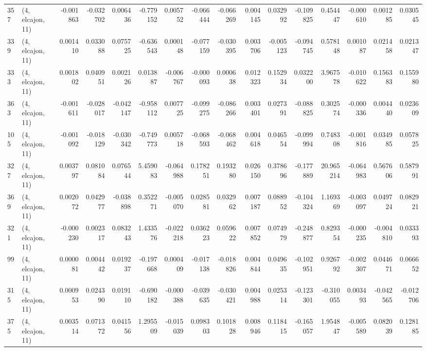 \begin{tabular}{llrrrrrrrrrrrrrr}
357 &  (4, elcajon, 11) &  -0.001863 & -0.032702 &  0.006436 &   -0.779152 &  0.005752 &  -0.066444 & -0.066269 &  0.004145 &  0.032992 & -0.109825 &     0.454447 & -0.000610 &  0.001285 &  0.030545 \\
339 &  (4, elcajon, 11) &   0.001410 &  0.033088 &  0.075725 &   -0.636543 &  0.000148 &  -0.077159 & -0.030395 &  0.003706 & -0.005123 & -0.094745 &     0.578148 &  0.001087 &  0.021458 &  0.021347 \\
333 &  (4, elcajon, 11) &   0.001802 &  0.040951 &  0.002126 &    0.013887 & -0.006767 &  -0.000093 &  0.000638 &  0.012323 &  0.152934 &  0.032200 &     3.967578 & -0.010622 &  0.156383 &  0.155980 \\
363 &  (4, elcajon, 11) &  -0.001611 & -0.028017 & -0.042147 &   -0.958112 &  0.007725 &  -0.099275 & -0.086266 &  0.003401 &  0.027391 & -0.088825 &     0.302574 & -0.000336 &  0.004440 &  0.023609 \\
105 &  (4, elcajon, 11) &  -0.001092 & -0.018129 & -0.030342 &   -0.749773 &  0.005718 &  -0.068593 & -0.068462 &  0.004618 &  0.046554 & -0.099994 &     0.748308 & -0.001816 &  0.034985 &  0.057825 \\
327 &  (4, elcajon, 11) &   0.003797 &  0.081084 &  0.076544 &    5.459083 & -0.064988 &   0.178251 &  0.193280 &  0.026150 &  0.378696 & -0.177889 &    20.965214 & -0.064983 &  0.567606 &  0.587991 \\
369 &  (4, elcajon, 11) &   0.002072 &  0.042977 & -0.038898 &    0.352271 & -0.005070 &   0.028581 &  0.032962 &  0.007187 &  0.088952 & -0.104324 &     1.169369 & -0.003097 &  0.049724 &  0.082921 \\
321 &  (4, elcajon, 11) &  -0.000230 &  0.002317 &  0.083243 &    1.433576 & -0.022218 &   0.036223 &  0.059622 &  0.007852 &  0.074979 & -0.248877 &     0.829354 & -0.000235 & -0.004810 &  0.033393 \\
99  &  (4, elcajon, 11) &   0.000081 &  0.004442 &  0.019237 &   -0.197668 &  0.000409 &  -0.017138 & -0.018826 &  0.004844 &  0.049635 & -0.102951 &     0.926792 & -0.002307 &  0.044671 &  0.066652 \\
315 &  (4, elcajon, 11) &   0.000953 &  0.024390 &  0.019110 &   -0.690182 & -0.000388 &  -0.039635 & -0.030421 &  0.004988 &  0.025314 & -0.123301 &    -0.310055 &  0.003493 & -0.042565 & -0.012706 \\
375 &  (4, elcajon, 11) &   0.003514 &  0.071372 &  0.041556 &    1.295509 & -0.015039 &   0.098303 &  0.101828 &  0.008946 &  0.118415 & -0.165057 &     1.954847 & -0.005589 &  0.082039 &  0.128185 \\

\end{tabular}
